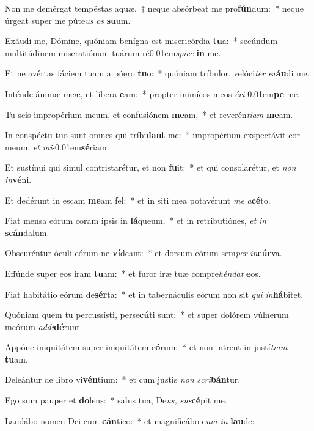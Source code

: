 \item Non me demérgat tempéstas aquæ,~† neque absórbeat me pro\textbf{fún}dum:~* neque úrgeat super me púte\textit{us} \textit{os} \textbf{su}um.
\item Exáudi me, Dómine, quóniam benígna est misericórdia \textbf{tu}a:~* secúndum multitúdinem miseratiónum tuárum ré\kern 0.01em\textit{spice} \textbf{in} me.
\item Et ne avértas fáciem tuam a púero \textbf{tu}o:~* quóniam tríbulor, velóci\textit{ter} \textit{ex}\textbf{áu}di me.
\item Inténde ánimæ meæ, et líbera \textbf{e}am:~* propter inimícos meos \textit{éri}\kern -0.01em\textbf{pe} me.
\item Tu scis impropérium meum, et confusiónem \textbf{me}am,~* et reverén\textit{tiam} \textbf{me}am.
\item In conspéctu tuo sunt omnes qui tríbu\textbf{lant} me:~* impropérium exspectávit cor meum, \textit{et} \textit{mi}\kern -0.01em\textbf{sé}riam.
\item Et sustínui qui simul contristarétur, et non \textbf{fu}it:~* et qui consolarétur, et \textit{non} \textit{in}\textbf{vé}ni.
\item Et dedérunt in escam \textbf{me}am fel:~* et in siti mea potavérunt \textit{me} \textit{a}\textbf{cé}to.
\item Fiat mensa eórum coram ipsis in \textbf{lá}queum,~* et in retributiónes, \textit{et} \textit{in} \textbf{scán}dalum.
\item Obscuréntur óculi eórum ne \textbf{ví}deant:~* et dorsum eórum sem\textit{per} \textit{in}\textbf{cúr}va.
\item Effúnde super eos iram \textbf{tu}am:~* et furor iræ tuæ compre\textit{héndat} \textbf{e}os.
\item Fiat habitátio eórum de\textbf{sér}ta:~* et in tabernáculis eórum non sit \textit{qui} \textit{in}\textbf{há}bitet.
\item Quóniam quem tu percussísti, perse\textbf{cú}ti sunt:~* et super dolórem vúlnerum meórum \textit{addi}\textbf{dé}runt.
\item Appóne iniquitátem super iniquitátem e\textbf{ó}rum:~* et non intrent in ju\-stí\textit{tiam} \textbf{tu}am.
\item Deleántur de libro vi\textbf{vén}tium:~* et cum ju\-stis \textit{non} \textit{scri}\textbf{bán}tur.
\item Ego sum pauper et \textbf{do}lens:~* salus tua, De\textit{us,} \textit{sus}\textbf{cé}pit me.
\item Laudábo nomen Dei cum \textbf{cán}tico:~* et magnificábo e\textit{um} \textit{in} \textbf{lau}de:
